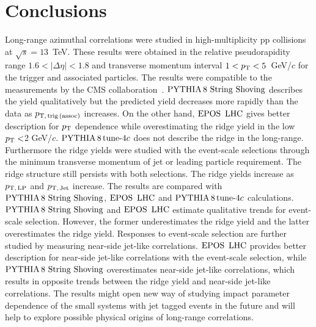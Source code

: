 
\section{Conclusions}
\label{sec:summary}
Long-range azimuthal correlations were studied in high-multiplicity pp collisions at $\sqrt{s} = 13$~TeV. These results were obtained in the relative pseudorapidity range $1.6 < |\Delta\eta| < 1.8$ and transverse momentum interval $1 < p_\mathrm{T} < 5$~GeV/$c$ for the trigger and associated particles. 
The results were compatible to the measurements by the CMS collaboration~\cite{Khachatryan:2015lva}.
${\mathrm{PYTHIA}\,8~\mathrm{String}~}\mathrm{Shoving}$ describes the yield qualitatively but the predicted yield decreases more rapidly than the data as $p_\mathrm{T,\,trig\,(assoc)}$ increases. On the other hand, ${\mathrm{EPOS}\,~\mathrm{LHC}}$ gives better description for $p_\mathrm{T}$ dependence while overestimating the ridge yield in the low $p_\mathrm{T}<$2 GeV/$c$. $\mathrm{PYTHIA}\,8\,\mathrm{tune}{\text -}4c$ does not describe the ridge in the long-range.
Furthermore the ridge yields were studied with the event-scale selections through the minimum transverse momentum of jet or leading particle requirement. 
The ridge structure still persists with both selections. The ridge yields increase as $p_\mathrm{T,\,LP}$ and $p_\mathrm{T,\,Jet}$ increase. The results are compared with ${\mathrm{PYTHIA}\,8~\mathrm{String}~}\mathrm{Shoving}$, ${\mathrm{EPOS}\,~\mathrm{LHC}}$ and $\mathrm{PYTHIA}\,8\,\mathrm{tune}{\text -}4c$ calculations. ${\mathrm{PYTHIA}\,8~\mathrm{String}~}\mathrm{Shoving}$ and ${\mathrm{EPOS}\,~\mathrm{LHC}}$ estimate qualitative trends for event-scale selection. However, the former underestimates the ridge yield and the latter overestimates the ridge yield.
Responses to event-scale selection are further studied by measuring near-side jet-like correlations. ${\mathrm{EPOS}\,~\mathrm{LHC}}$ provides better description for near-side jet-like correlations with the event-scale selection, while ${\mathrm{PYTHIA}\,8~\mathrm{String}~}\mathrm{Shoving}$ overestimates near-side jet-like correlations, which results in opposite trends between the ridge yield and near-side jet-like correlations.
The results might open new way of studying impact parameter dependence of the small systems with jet tagged events in the future and will help to explore possible physical origins of long-range correlations.
